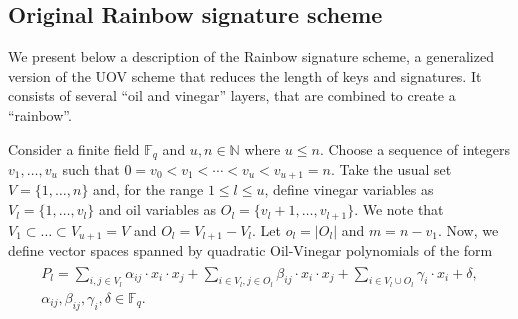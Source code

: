 \documentclass[draft, 12pt, a4paper, oneside]{memoir}
\theoremstyle{definition}
\theoremstyle{remark}
\begin{document}



\subsection{Original Rainbow signature scheme}\label{subsec:rainbow}

We present below a description of the Rainbow signature scheme, a
generalized version of the UOV scheme that reduces the length of keys and
signatures. It consists of several ``oil and vinegar'' layers, that are
combined to create a ``rainbow''. 

Consider a finite field $\mathbb{F}_{q}$ and
$u, n \in \mathbb{N}$ where $u \leq n$. Choose a sequence of integers
$v_{1}, \dots, v_{u}$ such that
$0 = v_{0} < v_{1} < \cdots < v_{u} < v_{u + 1} = n$. Take the usual set
$V = \{1, \dots, n\}$ and, for the range $1 \leq l \leq u$, define vinegar variables as
$V_{l} = \{1, \dots, v_{l}\}$ and oil variables as $O_{l} = \{v_{l} + 1, \dots, v_{l + 1}\}$. We note that $V_{1} \subset \dots \subset V_{u + 1} = V$ and $O_{l} = V_{l + 1} - V_{l}$. Let $o_{l} = |O_{l}|$ and $m = n - v_{1}$. Now,
we define vector spaces spanned by quadratic Oil-Vinegar polynomials of the
form
\begin{align}\label{eq:ov}
  \begin{split}
    P_{l} = \sum_{i, j \in V_{l}} \alpha_{ij} \cdot x_{i} \cdot x_{j}
      + \sum_{i \in V_{l}, j \in O_{l}} \beta_{ij} \cdot x_{i} \cdot x_{j}
      + \sum_{i \in V_{l} \cup O_{l}} \gamma_{i} \cdot x_{i} + \delta, \\
      \alpha_{ij}, \beta_{ij}, \gamma_{i}, \delta \in \mathbb{F}_{q}.
  \end{split}
\end{align}
\end{document}
